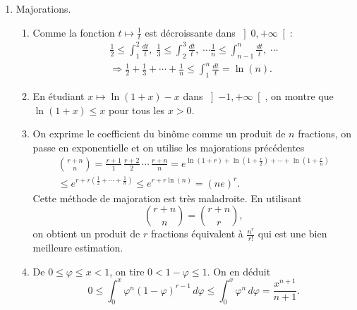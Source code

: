 \begin{enumerate}
  \item Majorations.
  \begin{enumerate}
    \item Comme la fonction $t \mapsto \frac{1}{t}$ est décroissante dans $\left] 0, + \infty\right[$:
\begin{multline*}
  \frac{1}{2} \leq \int_1^2\frac{dt}{t}, \;\frac{1}{3} \leq \int_2^3\frac{dt}{t}, \; \cdots 
  \frac{1}{n} \leq \int_{n-1}^{n}\frac{dt}{t}, \; \cdots \\
  \Rightarrow \frac{1}{2} + \frac{1}{3} + \cdots +\frac{1}{n} \leq \int_1^n \frac{dt}{t} = \ln(n).
\end{multline*}

    \item En étudiant $x\mapsto \ln(1+x) - x$ dans $\left] -1 , +\infty\right[$, on montre que $\ln(1+x) \leq x$ pour tous les $x>0$.
    \item On exprime le coefficient du binôme comme un produit de $n$ fractions, on passe en exponentielle et on utilise les majorations précédentes
\begin{multline*}
  \binom{r+n}{n} = \frac{r+1}{1}\,\frac{r+2}{2}\, \cdots \, \frac{r + n}{n}
  = e^{\ln(1+r) + \ln(1+\frac{r}{2})+ \cdots + \ln(1 + \frac{r}{n})} \\
  \leq e^{r + r\left(\frac{1}{2} + \cdots + \frac{1}{n}\right)}
  \leq e^{r + r \ln(n)} = (ne)^r .
\end{multline*}
Cette méthode de majoration est très maladroite. En utilisant 
\[
  \binom{r+n}{n} = \binom{r+n}{r},
\]
on obtient un produit de $r$ fractions équivalent à $\frac{n^r}{r!}$ qui est une bien meilleure estimation.
    \item De $0\leq \varphi \leq x <1$, on tire $0 < 1 - \varphi \leq 1$. On en déduit
\[
  0 \leq \int_0^x \varphi^n (1-\varphi)^{r-1} \, d\varphi \leq \int_0^x \varphi^n \, d\varphi = \frac{x^{n+1}}{n+1}. 
\]
  \end{enumerate}


\end{enumerate}

